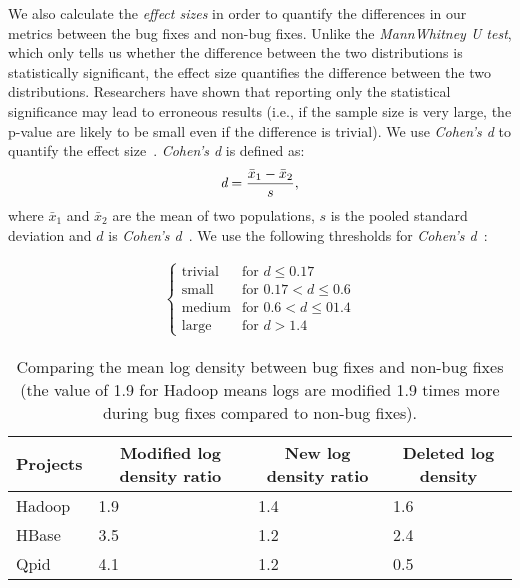 We also calculate the {\em effect sizes} in order to quantify the differences in our metrics between the bug fixes and non-bug fixes. Unlike the {\em MannWhitney U test}, which only tells us whether the difference between the two distributions is statistically significant, the effect size quantifies the difference between the two distributions. Researchers have shown that reporting only the statistical significance may lead to erroneous results (i.e., if the sample size is very large, the p-value are likely to be small even if the difference is trivial). We use {\em Cohen's d} to quantify the effect size~\cite{cohenUsage1,cohenUsage2}. {\em Cohen's d} is defined as:
\begin{equation} \text{{\em d}} = \frac{\bar{x}_1 - \bar{x}_2}{s},
\label{eq:cohensd}
\end{equation}
where $\bar{x}_1$ and $\bar{x}_2$ are the mean of two populations, $s$ is the pooled standard deviation and $d$ is \emph{Cohen's d}~\cite{shadish2009combining}. We use the following thresholds for {\em Cohen's d}~\cite{Effectsize}:

 \begin{align}\label{cohens-d_interpretation-se}
\begin{cases}
\text{trivial}		& \text{for $d \le 0.17$}		\\
\text{small}		& \text{for $0.17 < d \le 0.6$}	\\
\text{medium}	& \text{for $0.6 < d \le 01.4$}	\\
\text{large}		& \text{for $d > 1.4$}
\end{cases}
\end{align}



\begin{table}[t]
	\protect\caption{Comparing the mean log density between bug fixes and non-bug fixes (the value of 1.9 for Hadoop means logs are modified 1.9 times more during bug fixes compared to non-bug fixes).}
	
	
	\begin{tabular}{|l|lll|}
		\hline 
		\multirow{1}{*}{Projects} & \multicolumn{1}{c}{Modified log density ratio} & \multicolumn{1}{c}{New log density ratio} & \multicolumn{1}{c|}{Deleted log density}\tabularnewline
		\hline 
		\multirow{1}{*}{Hadoop} & 1.9 & 1.4 & 1.6\tabularnewline
		\multirow{1}{*}{HBase} & 3.5 & 1.2 & 2.4\tabularnewline
		\multirow{1}{*}{Qpid} & 4.1 & 1.2 & 0.5\tabularnewline
		\hline 
	\end{tabular}
	\label{tba:logdensityNewLogs}
\end{table}


